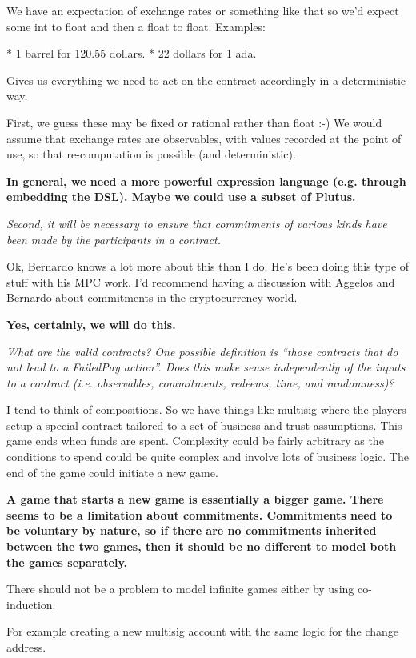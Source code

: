 \documentclass[
      acmsmall
    , screen
    , review=true
  ]{acmart}
\begin{document}
We have an expectation of exchange rates or something like that so we'd expect some int to float and then a float to float. Examples:


   * 1 barrel for 120.55 dollars.
   * 22 dollars for 1 ada.


Gives us everything we need to act on the contract accordingly in a deterministic way.


First, we guess these may be fixed or rational rather than float :-) We would assume that exchange rates are observables, with values recorded at the point of use, so that re-computation is possible (and deterministic). 

{\bf
In general, we need a more powerful expression language (e.g. through embedding the DSL). Maybe we could use a subset of Plutus.
}


{\it
Second, it will be necessary to ensure that commitments of various kinds have been made by the participants in a contract.
}

Ok, Bernardo knows a lot more about this than I do. He's been doing this type of stuff with his MPC work. I'd recommend having a discussion with Aggelos and Bernardo about
commitments in the cryptocurrency world.

{\bf
Yes, certainly, we will do this.
}

{\it
What are the valid contracts? One possible definition is ``those contracts that do not lead to a FailedPay action''. Does this make sense independently of the inputs to a contract (i.e. observables, commitments, redeems, time, and randomness)?
}

I tend to think of compositions.
So we have things like multisig where the players setup a special contract tailored to a set of business and trust assumptions. This game ends when funds are spent.
Complexity could be fairly arbitrary as the conditions to spend could be quite complex and involve lots of business logic. The end of the game could initiate a new game.

{\bf
A game that starts a new game is essentially a bigger game. There seems to be a limitation about commitments. Commitments need to be voluntary by nature, so if there are no commitments inherited between the two games, then it should be no different to model both the games separately.


There should not be a problem to model infinite games either by using co-induction.
}

For example creating a new multisig account with the same logic for the change address.
\end{document}
